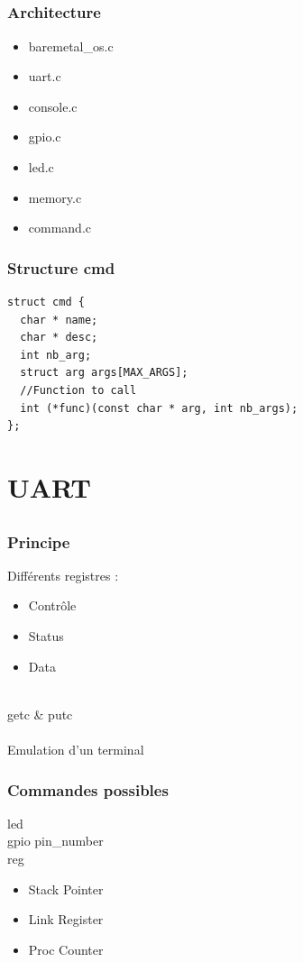 \documentclass{beamer}
\begin{document}
\subsection{ }

\begin{frame}

\end{frame}

\begin{frame}
\frametitle{Architecture}
\begin{itemize}
\item baremetal\_os.c
\item uart.c
\item console.c
\item gpio.c
\item led.c
\item memory.c
\item command.c
\end{itemize}
\end{frame}

\begin{frame}[fragile]
\frametitle{Structure cmd}
\begin{lstlisting}
struct cmd {
  char * name;
  char * desc;
  int nb_arg;
  struct arg args[MAX_ARGS];
  //Function to call
  int (*func)(const char * arg, int nb_args);
};
\end{lstlisting}
\end{frame}

\section{UART}
\subsection{}
\begin{frame}
  \frametitle{Principe}
  Différents registres :
  \begin{itemize}
    \item Contrôle
    \item Status
    \item Data
  \end{itemize}~\\
  \textsf{getc} \& \textsf{putc} \\~\\
  Emulation d'un terminal
\end{frame}

\begin{frame}
\frametitle{Commandes possibles}
  \textsf{led} \\
  \textsf{gpio pin\_number} \\
  \textsf{reg} \\
    \begin{itemize}
    \item Stack Pointer
    \item Link Register
    \item Proc Counter
    \end{itemize}
\end{frame}
\end{document}

